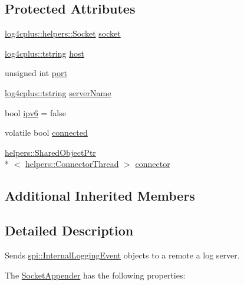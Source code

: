 \subsection*{Protected Attributes}
\begin{DoxyCompactItemize}
\item 
\hyperlink{classlog4cplus_1_1helpers_1_1Socket}{log4cplus\-::helpers\-::\-Socket} \hyperlink{classlog4cplus_1_1SocketAppender_a50fc7d3acd06519f954c8803dcbd774a}{socket}
\item 
\hyperlink{namespacelog4cplus_a3c9287f6ebcddc50355e29d71152117b}{log4cplus\-::tstring} \hyperlink{classlog4cplus_1_1SocketAppender_a6bdd29292be3aeb572d136e808d0012c}{host}
\item 
unsigned int \hyperlink{classlog4cplus_1_1SocketAppender_a26142f3cac36979c29f75f211e5a712b}{port}
\item 
\hyperlink{namespacelog4cplus_a3c9287f6ebcddc50355e29d71152117b}{log4cplus\-::tstring} \hyperlink{classlog4cplus_1_1SocketAppender_a185846efa2514d35f6009091a047a57e}{server\-Name}
\item 
bool \hyperlink{classlog4cplus_1_1SocketAppender_a4c89e1a58c466826ea6964bbd452539b}{ipv6} = false
\item 
volatile bool \hyperlink{classlog4cplus_1_1SocketAppender_afe3a09cb66c1948206291aa45d1a82cc}{connected}
\item 
\hyperlink{classlog4cplus_1_1helpers_1_1SharedObjectPtr}{helpers\-::\-Shared\-Object\-Ptr}\\*
$<$ \hyperlink{classlog4cplus_1_1helpers_1_1ConnectorThread}{helpers\-::\-Connector\-Thread} $>$ \hyperlink{classlog4cplus_1_1SocketAppender_aa50560397e03ddeb90e769159edfdf93}{connector}
\end{DoxyCompactItemize}
\subsection*{Additional Inherited Members}


\subsection{Detailed Description}
Sends \hyperlink{classlog4cplus_1_1spi_1_1InternalLoggingEvent}{spi\-::\-Internal\-Logging\-Event} objects to a remote a log server.

The \hyperlink{classlog4cplus_1_1SocketAppender}{Socket\-Appender} has the following properties\-:


